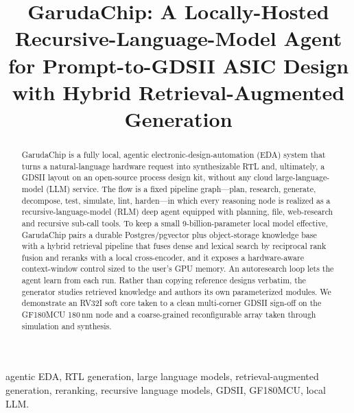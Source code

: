 \documentclass[conference]{IEEEtran}
\begin{document}
\title{GarudaChip: A Locally-Hosted Recursive-Language-Model Agent for
Prompt-to-GDSII ASIC Design with Hybrid Retrieval-Augmented Generation}

\author{
}

\maketitle

\begin{abstract}
GarudaChip is a fully local, agentic electronic-design-automation (EDA) system
that turns a natural-language hardware request into synthesizable RTL and,
ultimately, a GDSII layout on an open-source process design kit, without any
cloud large-language-model (LLM) service. The flow is a fixed pipeline
graph---plan, research, generate, decompose, test, simulate, lint, harden---in
which every reasoning node is realized as a recursive-language-model (RLM) deep
agent equipped with planning, file, web-research and recursive sub-call tools. To
keep a small 9-billion-parameter local model effective, GarudaChip pairs a
durable Postgres/pgvector plus object-storage knowledge base with a hybrid
retrieval pipeline that fuses dense and lexical search by reciprocal rank fusion
and reranks with a local cross-encoder, and it exposes a hardware-aware
context-window control sized to the user's GPU memory. An autoresearch loop lets
the agent learn from each run. Rather than copying reference designs verbatim,
the generator studies retrieved knowledge and authors its own parameterized
modules. We demonstrate an RV32I soft core taken to a clean multi-corner GDSII
sign-off on the GF180MCU 180\,nm node and a coarse-grained reconfigurable array
taken through simulation and synthesis.
\end{abstract}

\begin{IEEEkeywords}
agentic EDA, RTL generation, large language models, retrieval-augmented
generation, reranking, recursive language models, GDSII, GF180MCU, local LLM.
\end{IEEEkeywords}
\end{document}

